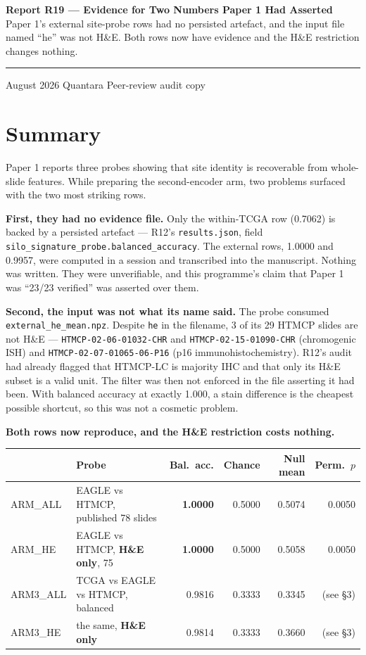 \documentclass[11pt,a4paper]{article}
\begin{document}
\thispagestyle{empty}
\noindent
{\large\bfseries\color{qnavy} Report R19 --- Evidence for Two Numbers Paper 1 Had Asserted}\\[2pt]
{\color{qgrey}Paper 1's external site-probe rows had no persisted artefact, and the input file
named ``he'' was not H\&E. Both rows now have evidence and the H\&E restriction changes
nothing.}\\[6pt]
{\color{qgrey}\rule{\textwidth}{0.4pt}}

\medskip
{} August 2026 \quad\textbullet\quad Quantara \quad\textbullet\quad
{\color{qgrey}Peer-review audit copy}

\section*{Summary}

Paper 1 reports three probes showing that site identity is recoverable from whole-slide features.
While preparing the second-encoder arm, two problems surfaced with the two most striking rows.

\textbf{First, they had no evidence file.} Only the within-TCGA row (0.7062) is backed by a
persisted artefact --- R12's \texttt{results.json}, field
\texttt{silo\_signature\_probe.balanced\_accuracy}. The external rows, 1.0000 and 0.9957, were
computed in a session and transcribed into the manuscript. Nothing was written. They were
unverifiable, and this programme's claim that Paper 1 was ``23/23 verified'' was asserted over
them.

\textbf{Second, the input was not what its name said.} The probe consumed
\texttt{external\_he\_mean.npz}. Despite \texttt{he} in the filename, 3 of its 29 HTMCP slides are
not H\&E --- \texttt{HTMCP-02-06-01032-CHR} and \texttt{HTMCP-02-15-01090-CHR} (chromogenic ISH)
and \texttt{HTMCP-02-07-01065-06-P16} (p16 immunohistochemistry). R12's audit had already flagged
that HTMCP-LC is majority IHC and that only its H\&E subset is a valid unit. The filter was then
not enforced in the file asserting it had been. With balanced accuracy at exactly 1.000, a stain
difference is the cheapest possible shortcut, so this was not a cosmetic problem.

\textbf{Both rows now reproduce, and the H\&E restriction costs nothing.}

\begin{center}
\begin{tabular}{@{}llrrrr@{}}
\toprule
& \textbf{Probe} & \textbf{Bal.\ acc.} & \textbf{Chance} & \textbf{Null mean} &
\textbf{Perm.\ $p$} \\
\midrule
ARM\_ALL & EAGLE vs HTMCP, published 78 slides & \textbf{1.0000} & 0.5000 & 0.5074 & 0.0050 \\
ARM\_HE & EAGLE vs HTMCP, \textbf{H\&E only}, 75 & \textbf{1.0000} & 0.5000 & 0.5058 & 0.0050 \\
\midrule
ARM3\_ALL & TCGA vs EAGLE vs HTMCP, balanced & 0.9816 & 0.3333 & 0.3345 & (see \S3) \\
ARM3\_HE & the same, \textbf{H\&E only} & 0.9814 & 0.3333 & 0.3660 & (see \S3) \\
\bottomrule
\end{tabular}
\end{center}
\end{document}
